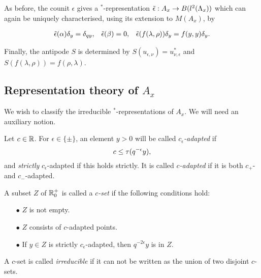 As before, the counit $\epsilon$ gives a $^*$-representation $\operatorname{\tilde{\epsilon}}:A_x \rightarrow B(l^2(\Lambda_x))$ which can again be uniquely characterised, using its extension to $M(A_x)$, by 

\begin{align*} \operatorname{\tilde{\epsilon}}(\alpha) \delta_y = \delta_{qy},&& \operatorname{\tilde{\epsilon}}(\beta) = 0,&&\operatorname{\tilde{\epsilon}}(f(\lambda,\rho))\delta_y = f(y,y)\delta_y.\end{align*}

Finally, the antipode $S$ is determined by $S(u_{\epsilon,\nu}) = u_{\nu,\epsilon}^*$ and $S(f(\lambda,\rho)) = f(\rho,\lambda)$. 

\subsection{Representation theory of $A_x$}


We wish to classify the irreducible $^*$-representations of $A_x$. We will need an auxiliary notion.



\begin{Def}\label{DefAdapt} Let $c\in\mathbb{R}$. For $\epsilon \in \{\pm\}$, an element $y>0$ will be called \emph{$c_{\epsilon}$-adapted} if \begin{equation}\label{EqAd+} c \leq \operatorname{\tau}(q^{-\epsilon}y),\end{equation} and \emph{strictly} $c_{\epsilon}$-adapted if this holds strictly. It is called \emph{$c$-adapted} if it is both $c_+$- and $c_-$-adapted. 

A subset $Z$ of $\mathbb{R}^+_0$ is called a \emph{$c$-set} if the following conditions hold: \begin{itemize} 
\item[$\bullet$] $Z$ is not empty.
\item[$\bullet$] $Z$ consists of $c$-adapted points.
\item[$\bullet$] If $y\in Z$ is strictly $c_{\epsilon}$-adapted, then $q^{-2\epsilon}y$ is in $Z$.
\end{itemize}
A $c$-set is called \emph{irreducible} if it can not be written as the union of two disjoint $c$-sets.
\end{Def}

